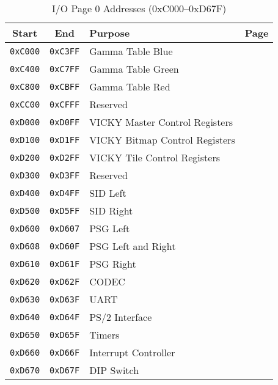 \begin{table}[ht]
    \begin{center}
        \begin{tabular}{|c|c|l|l|} \hline
            Start & End & Purpose & Page \\ \hline \hline
            \verb+0xC000+ & \verb+0xC3FF+ & Gamma Table Blue & \multirow{3}{*}{\pageref{sec:gamma}} \\ \cline{1-3}
            \verb+0xC400+ & \verb+0xC7FF+ & Gamma Table Green & \\ \cline{1-3}
            \verb+0xC800+ & \verb+0xCBFF+ & Gamma Table Red & \\ \hline
            \verb+0xCC00+ & \verb+0xCFFF+ & Reserved & \\ \hline
            \verb+0xD000+ & \verb+0xD0FF+ & VICKY Master Control Registers & \pageref{tab:vky_master_ctrl_reg}\\ \hline
            \verb+0xD100+ & \verb+0xD1FF+ & VICKY Bitmap Control Registers & \pageref{tab:bm_registers} \\ \hline
            \verb+0xD200+ & \verb+0xD2FF+ & VICKY Tile Control Registers & \pageref{tab:tilemap_reg} \\ \hline
            \verb+0xD300+ & \verb+0xD3FF+ & Reserved & \\ \hline
            \verb+0xD400+ & \verb+0xD4FF+ & SID Left & \multirow{2}{*}{\pageref{tab:sid_registers}} \\ \cline{1-3}
            \verb+0xD500+ & \verb+0xD5FF+ & SID Right & \\ \hline
            \verb+0xD600+ & \verb+0xD607+ & PSG Left & \multirow{3}{*}{\pageref{tab:psg_registers}} \\ \cline{1-3}
            \verb+0xD608+ & \verb+0xD60F+ & PSG Left and Right & \\ \cline{1-3}
            \verb+0xD610+ & \verb+0xD61F+ & PSG Right & \\ \hline
            \verb+0xD620+ & \verb+0xD62F+ & CODEC & \pageref{tab:codec_registers} \\ \hline
            \verb+0xD630+ & \verb+0xD63F+ & UART & \pageref{tab:uart_reg} \\ \hline
            \verb+0xD640+ & \verb+0xD64F+ & PS/2 Interface & \pageref{tab:ps2_reg} \\ \hline
            \verb+0xD650+ & \verb+0xD65F+ & Timers & \pageref{tab:timer_reg} \\ \hline
            \verb+0xD660+ & \verb+0xD66F+ & Interrupt Controller & \pageref{chap:interrupts} \\ \hline
            \verb+0xD670+ & \verb+0xD67F+ & DIP Switch & \pageref{tab:dip_reg} \\ \hline
        \end{tabular}
        \caption{I/O Page 0 Addresses (0xC000--0xD67F)}
        \label{tab:io_page_0}
    \end{center}
\end{table}

